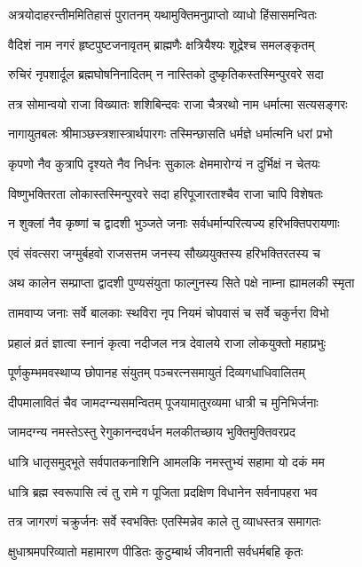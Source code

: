 \twolineshloka
{अत्रयोदाहरन्तीममितिहासं पुरातनम्}
{यथामुक्तिमनुप्राप्तो व्याधो हिंसासमन्वितः} %

\twolineshloka
{वैदिशं नाम नगरं हृष्टपुष्टजनावृतम्}
{ब्राह्मणैः क्षत्रियैश्यः शूद्रेश्च समलङ्कृतम्} %

\twolineshloka
{रुचिरं नृपशार्दूल ब्रह्मघोषनिनादितम्}
{न नास्तिको दुष्कृतिकस्तस्मिन्पुरवरे सदा} %

\twolineshloka
{तत्र सोमान्वयो राजा विख्यातः शशिबिन्दवः}
{राजा चैत्ररथो नाम धर्मात्मा सत्यसङ्गरः} %

\twolineshloka
{नागायुतबलः श्रीमाञ्छस्त्रशास्त्रार्थपारगः}
{तस्मिन्छासति धर्मज्ञे धर्मात्मनि धरां प्रभो} %

\twolineshloka
{कृपणो नैव कुत्रापि दृश्यते नैव निर्धनः}
{सुकालः क्षेममारोग्यं न दुर्भिक्षं न चेतयः} %

\twolineshloka
{विष्णुभक्तिरता लोकास्तस्मिन्पुरवरे सदा}
{हरिपूजारताश्चैव राजा चापि विशेषतः} %

\twolineshloka
{न शुक्लां नैव कृष्णां च द्वादशी भुञ्जते जनाः}
{सर्वधर्मान्परित्यज्य हरिभक्तिपरायणाः} %

\twolineshloka
{एवं संवत्सरा जग्मुर्बहवो राजसत्तम}
{जनस्य सौख्ययुक्तस्य हरिभक्तिरतस्य च} %

\twolineshloka
{अथ कालेन सम्प्राप्ता द्वादशी पुण्यसंयुता}
{फाल्गुनस्य सिते पक्षे नाम्ना ह्यामलकी स्मृता} %

\twolineshloka
{तामवाप्य जनाः सर्वे बालकाः स्थविरा नृप}
{नियमं चोपवासं च सर्वे चकुर्नरा विभो} %

\twolineshloka
{प्रहालं व्रतं ज्ञात्वा स्नानं कृत्वा नदीजल}
{नत्र देवालये राजा लोकयुक्तो महाप्रभुः} %

\twolineshloka
{पूर्णकुम्भमवस्थाप्य छोपानह संयुतम्}
{पञ्चरत्नसमायुतं दिव्यगधाधिवालितम्} %

\twolineshloka
{दीपमालावितं चैव जामदग्न्यसमन्वितम्}
{पूजयामातुरव्यमा धात्री च मुनिभिर्जनाः} %

\twolineshloka
{जामदग्न्य नमस्तेऽस्तु रेगुकानन्दवर्धन}
{मलकीतच्छाय भुक्तिमुक्तिवरप्रद} %

\twolineshloka
{धात्रि धातृसमुद्भूते सर्वपातकनाशिनि}
{आमलकि नमस्तुभ्यं सहामा यो दकं मम} %

\twolineshloka
{धात्रि ब्रह्म स्वरूपासि त्वं तु रामे ग पूजिता}
{प्रदक्षिण विधानेन सर्वनापहरा भव} %

\twolineshloka
{तत्र जागरणं चक्रुर्जनः सर्वे स्वभक्तिः}
{एतस्मिन्नेव काले तु व्याधस्तत्र समागतः} %

\twolineshloka
{क्षुधाश्रमपरिव्यातो महामारण पीडितः}
{कुटुम्बार्थ जीवनाती सर्वधर्मबहि कृतः} %

